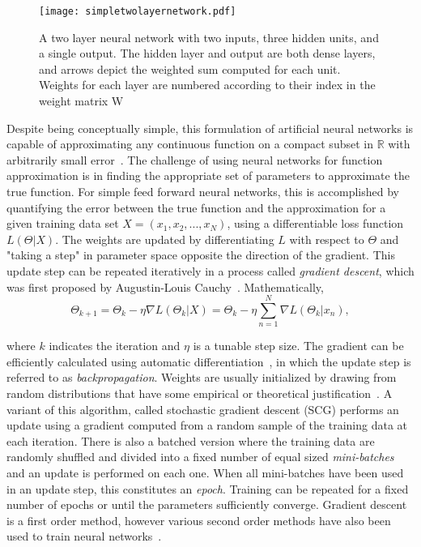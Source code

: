 \begin{figure}
	\centering
	\texttt{[image: simpletwolayernetwork.pdf]}
	\caption{A two layer neural network with two inputs, three hidden units, and a single output. The hidden layer and output are both dense layers, and arrows depict the weighted sum computed for each unit. Weights for each layer are numbered according to their index in the weight matrix W}
	\label{fig:twolayernetwork}
\end{figure}


Despite being conceptually simple, this formulation of artificial neural networks is capable of approximating any continuous function on a compact subset in $\mathbb{R}$ with arbitrarily small error~\cite{cybenko1989}.
The challenge of using neural networks for function approximation is in finding the appropriate set of parameters to approximate the true function.
For simple feed forward neural networks, this is accomplished by quantifying the error between the true function and the approximation for a given training data set $X=(x_1, x_2, ..., x_N)$, using a differentiable loss function $L(\Theta | X)$. 
The weights are updated by differentiating $L$ with respect to $\Theta$ and "taking a step" in parameter space opposite the direction of the gradient. 
This update step can be repeated iteratively in a process called \textit{gradient descent}, which was first proposed by Augustin-Louis Cauchy~\cite{cauchy1847}.
Mathematically, 
\begin{equation}
\Theta_{k+1} = \Theta_k - \eta \nabla L(\Theta_k | X) = \Theta_k - \eta \sum_{n=1}^{N} \nabla L(\Theta_k | x_n),
\label{eq:batch_gd}
\end{equation}

\noindent
where $k$ indicates the iteration and $\eta$ is a tunable step size.
The gradient can be efficiently calculated using automatic differentiation~\cite{linnainmaa1976}, in which the update step is referred to as \textit{backpropagation}.
Weights are usually initialized by drawing from random distributions that have some empirical or theoretical justification~\cite{glorot2010}.
A variant of this algorithm, called stochastic gradient descent (SCG) performs an update using a gradient computed from a random sample of the training data at each iteration.
There is also a batched version where the training data are randomly shuffled and divided into a fixed number of equal sized \textit{mini-batches} and an update is performed on each one. 
When all mini-batches have been used in an update step, this constitutes an \textit{epoch}.
Training can be repeated for a fixed number of epochs or until the parameters sufficiently converge.
Gradient descent is a first order method, however various second order methods have also been used to train neural networks~\cite{fletcher1964, polak1969, moller1993, marquardt1963}.

